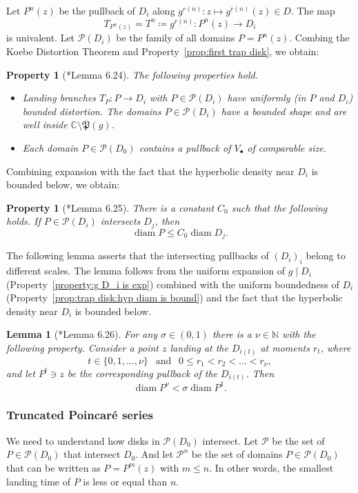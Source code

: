 \documentclass{amsart}
\renewcommand{\sp}{{\ \ }}
\newcommand{\1}{{\mathbb 1 }}
\newcommand\ovPost{{\overline{\mathfrak P}}}
\newcommand\scrP{\mathscr{P}}
\newcommand\PP{\mathcal{P}}
\newcommand{\C}{\mathbb{C}}
\newcommand{\N}{\mathbb{N}}
\newtheorem{lem}[thm]{Lemma}
\newtheorem{property}[thm]{Property}
\theoremstyle{remark}
\numberwithin{equation}{section}
\theoremstyle{definition}
\newcommand{\diam}{\operatorname{diam}}
\theoremstyle{nonumberbreak}
\begin{document}
Let $P^n(z)$ be the pullback of $D_i$ along $g^{r(n)}\colon z\mapsto g^{r(n)}(z)\in D$. The map \[T_{P^n(z)}=T^n\coloneqq g^{r(n)}\colon P^n(z)\to D_i\] is univalent. Let $\PP(D_i)$ be the family of all domains $P=P^n(z)$. Combing the Koebe Distortion Theorem and Property~\ref{prop:first trap disk}, we obtain: 

\begin{property}[\cite{AL-posmeas}*{Lemma 6.24}] The following properties hold.
\begin{itemize}
\item  Landing branches $T_P\colon P\to D_i$ with $P\in \PP(D_i)$ have uniformly (in $P$ and $D_i$) bounded distortion. The domains $P\in \PP(D_i)$ have a bounded shape and are well inside $\C\setminus \ovPost(g)$. 
\item Each domain $P\in \PP(D_0)$ contains a pullback of $V_\bullet$ of comparable size. 
\end{itemize}
\end{property}


Combining expansion with the fact that the hyperbolic density near $D_i$ is bounded below, we obtain: 

\begin{property}[\cite{AL-posmeas}*{Lemma 6.25}]
\label{prop:P int D:bound}
There is a constant $C_0$ such that the following holds. If $P\in \PP(D_i)$ intersects $D_j$, then
\[\diam P\le C_0 \diam D_j.\]
\end{property}


The following lemma asserts that the intersecting pullbacks of $(D_i)_i$ belong to different scales. The lemma follows from the uniform expansion of $g\mid D_i$ (Property~\ref{property:g D_i is exp}) combined with the uniform boundedness of $D_i$ (Property~\ref{prop:trap disk:hyp diam is bound}) and the fact that the hyperbolic density near $D_i$ is bounded below.
\begin{lem}[\cite{AL-posmeas}*{Lemma 6.26}]
\label{lem:pullbacks are in different scales}
For any $\sigma\in (0,1)$ there is a $\nu \in \N$ with the following property. Consider a point $z$ landing at the $D_{i(t)}$ at moments $r_t$, where \[t\in \{0,1,\dots,\nu\}\sp \text{ and }\sp 0\le r_1< r_2<  \dots <r_\nu ,\] and
let $P^t\ni z$ be the corresponding pullback of the $D_{i(t)}$. Then
\[\diam P^\nu< \sigma \diam P^1.\]
\end{lem}



\subsubsection{Truncated Poincar\'e series}
We need to understand how disks in $\PP(D_0)$ intersect. Let $\scrP$ be the set of $P\in \PP(D_0)$ that intersect $D_0$. And let $\scrP^n$ be the set of domains $P\in \PP(D_0)$ that can be written as $P=P^m(z)$ with $m\le n$. In other words, the smallest landing time of $P$ is less or equal than $n$.
\end{document}

